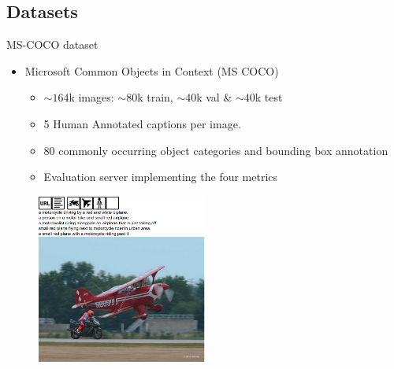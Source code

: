 \documentclass{beamer}
\begin{document}
\subsection{Datasets}
\begin{frame}{MS-COCO dataset}
\begin{itemize}
    \item Microsoft Common Objects in Context (MS COCO)
       \begin{itemize}
            \item $\sim164$k images: $\sim80$k train, $\sim40$k val \& $\sim40$k test 
            \item 5 Human Annotated captions per image.
            \item 80 commonly occurring object categories and bounding box annotation
            \item Evaluation server implementing the four metrics 
       \end{itemize}
\end{itemize}\vspace{-3mm}
    \begin{figure}[h]
        \centering
        \includegraphics[width=0.5\textwidth]{images/Coco_sample.png}
        \vfill
    \end{figure}
\end{frame}
\end{document}
